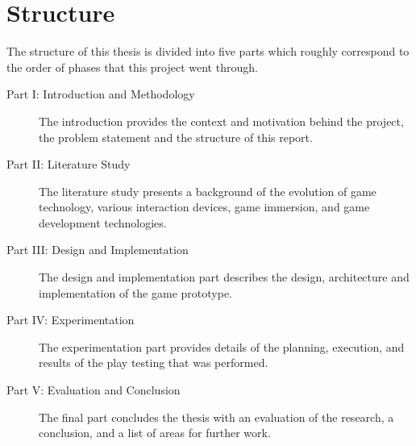 \section{Structure}
The structure of this thesis is divided into five parts which roughly correspond to the order of phases that this project went through.

\begin{description}
	\item[Part I: Introduction and Methodology]
	The introduction provides the context and motivation behind the project, the problem statement and the structure of this report.
	
	\item[Part II: Literature Study]
	The literature study presents a background of the evolution of game technology, various interaction devices, game immersion, and game development technologies.
	
	\item[Part III: Design and Implementation]
	The design and implementation part describes the design, architecture and implementation of the game prototype.
	
	\item[Part IV: Experimentation]
	The experimentation part provides details of the planning, execution, and results of the play testing that was performed.
	
	\item[Part V: Evaluation and Conclusion]
	The final part concludes the thesis with an evaluation of the research, a conclusion, and a list of areas for further work.
	
\end{description}
